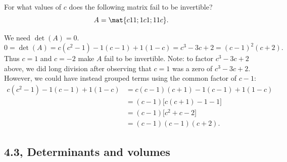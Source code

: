 \begin{problems}
\problem %
For what values of $c$ does the following matrix fail to be invertible?
\[A = \mat{c 1 1; 1 c 1; 1 1 c}.\]
\begin{solution}
We need $\det(A) = 0$.
\[0 = \det(A) = c(c^2-1) - 1(c-1) +1(1-c) = c^3-3c+2 = (c-1)^2(c+2).\] Thus
$c=1$ and $c = -2$ make $A$ fail to be invertible. \newline %
Note: to factor $c^3-3c+2$ above, we did long division after observing that
$c=1$ was a zero of $c^3-3c+2$.  However, we could have instead grouped terms
using the common factor of $c-1$:
\begin{align*}
  c(c^2-1)-1(c-1)+1(1-c)
  & = c(c-1)(c+1)-1(c-1)+1(1-c) \\
  & = (c-1)\Big[c(c+1)-1-1\Big] \\
  & = (c-1)\Big[c^2+c-2\Big] \\
  & = (c-1)(c-1)(c+2).
\end{align*}
\end{solution}

\end{problems} \setcounter{problem}{0}

\newpage

\subsection{4.3, Determinants and volumes}

